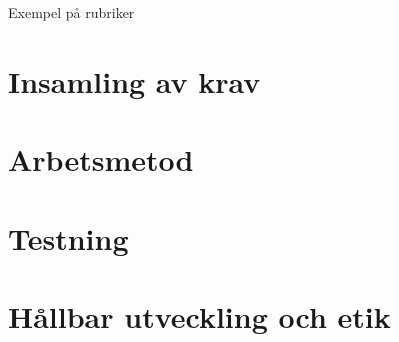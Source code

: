 Exempel på rubriker


\section{Insamling av krav}


\section{Arbetsmetod}


\section{Testning}


\section{Hållbar utveckling och etik}

